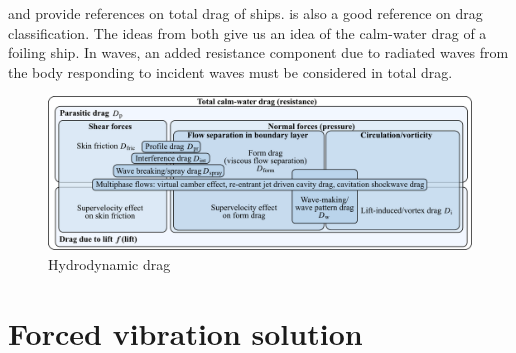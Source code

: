 \documentclass[10pt]{article}
\begin{document}
\citet[Fig. 21.3]{carlton2007} and \citet[Fig. 4]{Chernyshev2023} provide references on total drag of ships.
\citet[Fig. 12.2]{Raymer2012} is also a good reference on drag classification.
The ideas from both give us an idea of the calm-water drag of a foiling ship.
In waves, an added resistance component due to radiated waves from the body responding to incident waves must be considered in total drag.
\begin{figure}[htb!]
	\centering
	\includegraphics[width=\linewidth,clip,trim={0cm 0cm 0cm 0cm}]{modernDragBuildUp_v2.pdf}
	\caption{\label{fig:HydroDrag}Hydrodynamic drag}
\end{figure}
\clearpage
\section{Forced vibration solution}
\end{document}
